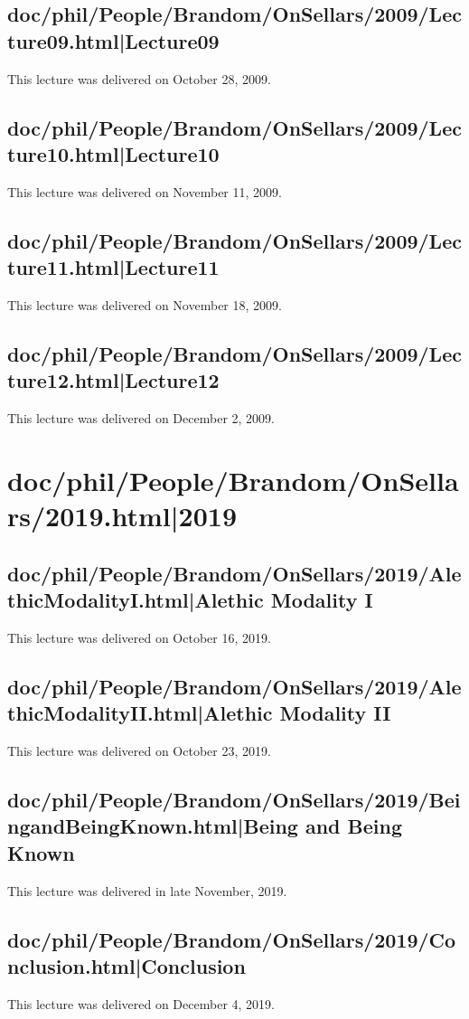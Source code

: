 \documentclass[12pt,a4paper]{report}
\begin{document}
\section{doc/phil/People/Brandom/OnSellars/2009/Lecture09.html|Lecture09}
This lecture was delivered on October 28, 2009.

\section{doc/phil/People/Brandom/OnSellars/2009/Lecture10.html|Lecture10}
This lecture was delivered on November 11, 2009.

\section{doc/phil/People/Brandom/OnSellars/2009/Lecture11.html|Lecture11}
This lecture was delivered on November 18, 2009.

\section{doc/phil/People/Brandom/OnSellars/2009/Lecture12.html|Lecture12}
This lecture was delivered on December 2, 2009.

\chapter{doc/phil/People/Brandom/OnSellars/2019.html|2019}

\section{doc/phil/People/Brandom/OnSellars/2019/AlethicModalityI.html|Alethic Modality I}
This lecture was delivered on October 16, 2019.

\section{doc/phil/People/Brandom/OnSellars/2019/AlethicModalityII.html|Alethic Modality II}
This lecture was delivered on October 23, 2019.

\section{doc/phil/People/Brandom/OnSellars/2019/BeingandBeingKnown.html|Being and Being Known}
This lecture was delivered in late November, 2019.

\section{doc/phil/People/Brandom/OnSellars/2019/Conclusion.html|Conclusion}
This lecture was delivered on December 4, 2019.
\end{document}
